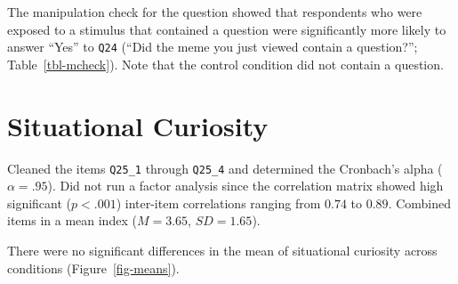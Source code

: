 \documentclass[
  letterpaper,
  DIV=11,
  numbers=noendperiod]{scrartcl}
\begin{document}
The manipulation check for the question showed that respondents who were
exposed to a stimulus that contained a question were significantly more
likely to answer ``Yes'' to \texttt{Q24} (``Did the meme you just viewed
contain a question?''; Table~\ref{tbl-mcheck}). Note that the control
condition did not contain a question.

\begin{table}

\caption{\label{tbl-mcheck}Manipulation check for presence of a
question.}


\end{table}%

\section{Situational Curiosity}\label{situational-curiosity}

Cleaned the items \texttt{Q25\_1} through \texttt{Q25\_4} and determined
the Cronbach's alpha (\(\alpha = .95\)). Did not run a factor analysis
since the correlation matrix showed high significant (\(p < .001\))
inter-item correlations ranging from \(0.74\) to \(0.89\). Combined
items in a mean index (\(M = 3.65\), \(SD = 1.65\)).

There were no significant differences in the mean of situational
curiosity across conditions (Figure~\ref{fig-means}).
\end{document}
